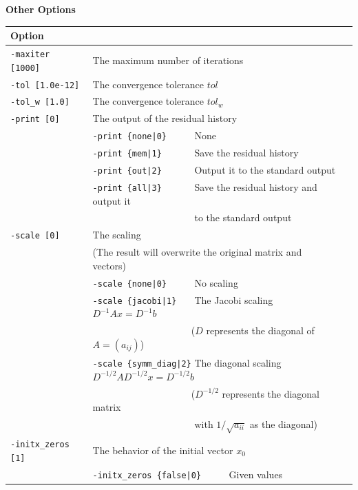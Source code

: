 \documentclass[a4paper]{article}
\begin{document}
\begin{minipage}[t]{\textwidth}
\begin{center}
{\bf Other Options}\\
\begin{tabular}{l|ll}\hline\hline
Option &                          \\ \hline
\verb=-maxiter [1000]= & The maximum number of iterations         \\ 
\verb=-tol [1.0e-12]=  & The convergence tolerance $tol$            \\
\verb=-tol_w [1.0]=    & The convergence tolerance $tol_w$  \\
\verb=-print [0]=      & The output of the residual history                \\
                       & \verb=-print {none|0}     =  None \\
                       & \verb=-print {mem|1}      =  Save the residual history\\
                       & \verb=-print {out|2}      =  Output it to the standard output\\
                       & \verb=-print {all|3}      =  Save the residual history and output it \\ 
                       & \verb=                    =  to the standard output \\
\verb=-scale [0]=      & The scaling \\
                       & (The result will overwrite the original matrix and vectors) \\
                       & \verb=-scale {none|0}     =  No scaling \\ 
                       & \verb=-scale {jacobi|1}   =  The Jacobi scaling $D^{-1}Ax=D^{-1}b$ \\
                       & \verb=                    =  ($D$ represents the diagonal of $A=(a_{ij})$)\\
                       & \verb=-scale {symm_diag|2}=  The diagonal scaling $D^{-1/2}AD^{-1/2}x=D^{-1/2}b$ \\
                       & \verb=                    =  ($D^{-1/2}$ represents the diagonal matrix \\
                       & \verb=                    =  with $1/\sqrt{a_{ii}}$ as the diagonal) \\ 
\verb=-initx_zeros [1]= & The behavior of the initial vector $x_{0}$  \\
                       & \verb=-initx_zeros {false|0}     =  Given values \\

\end{tabular}
\end{center}
\end{minipage}
\end{document}
